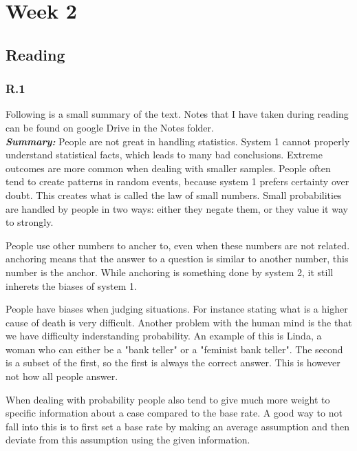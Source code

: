 \documentclass[]{article}
\begin{document}
\clearpage
{}
\section*{Week 2}

\subsection*{Reading} 

\subsubsection*{R.1}
Following is a small summary of the text. Notes that I have taken during reading 
can be found on google Drive in the Notes folder.\\

\textbf{\textit{Summary: }} 
People are not great in handling statistics. System 1 cannot properly understand 
statistical facts, which leads to many bad conclusions. Extreme outcomes are 
more common when dealing with smaller samples. People often tend to create patterns
in random events, because system 1 prefers certainty over doubt. This creates 
what is called the law of small numbers. Small probabilities are handled by 
people in two ways: either they negate them, or they value it way to strongly.

People use other numbers to ancher to, even when these numbers are not related. 
anchoring means that the answer to a question is similar to another number, this 
number is the anchor. While anchoring is something done by system 2, it still 
inherets the biases of system 1. 

People have biases when judging situations. For instance stating what is a higher
cause of death is very difficult. Another problem with the human mind is the 
that we have difficulty inderstanding probability. An example of this is Linda,
a woman who can either be a "bank teller" or a "feminist bank teller". The second 
is a subset of the first, so the first is always the correct answer. This is 
however not how all people answer.

When dealing with probability people also tend to give much more weight to specific 
information about a case compared to the base rate. A good way to not fall into 
this is to first set a base rate by making an average assumption and then 
deviate from this assumption using the given information.
\end{document}
